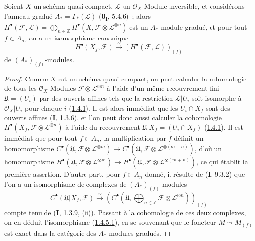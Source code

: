\begin{proposition}[1.4.5]
\label{III.1.4.5-fr}
Soient $X$ un schéma quasi-compact, $\mathcal L$ un $\mathcal O_X$-Module
inversible, et considérons l'anneau gradué
$A_*=\Gamma_*(\mathcal L)$ \textup{(\textbf{0}\textsubscript{I}, 5.4.6)}~; alors
$H^\bullet(\mathcal F,\mathcal L)
=\bigoplus_{n\in\mathbb Z}H^\bullet(X,\mathcal F\otimes\mathcal L^{\otimes n})$
est un $A_*$-module gradué, et pour tout $f\in A_n$, on a un
isomorphisme canonique
\begin{equation}
\label{III.1.4.5.1-fr}
\tag{1.4.5.1}
H^\bullet(X_f,\mathcal F)
\xrightarrow{\sim}(H^\bullet(\mathcal F,\mathcal L))_{(f)}
\end{equation}
de $(A_*)_{(f)}$-modules.
\end{proposition}

\begin{proof}
Comme $X$ est un schéma quasi-compact, on peut calculer la cohomologie de
tous les $\mathcal O_X$-Modules
$\mathcal F\otimes\mathcal L^{\otimes n}$ à l'aide d'un même recouvrement
fini $\mathfrak U=(U_i)$ par des ouverts affines tels que la restriction
$\mathcal L\vert U_i$ soit isomorphe à $\mathcal O_X\vert U_i$ pour chaque
$i$ (\hyperref[III.1.4.1-fr]{1.4.1}). Il est alors immédiat que les
$U_i\cap X_f$ sont des ouverts affines (\textbf{I}, 1.3.6), et l'on peut donc aussi
calculer la cohomologie
$H^\bullet(X_f,\mathcal F\otimes\mathcal L^{\otimes n})$ à l'aide du
recouvrement $\mathfrak U\vert X_f=(U_i\cap X_f)$
(\hyperref[III.1.4.1-fr]{1.4.1}). Il est immédiat que pour tout $f\in A_n$,
la multiplication par $f$ définit un homomorphisme
$C^\bullet(\mathfrak U,\mathcal F\otimes\mathcal L^{\otimes m})
\longrightarrow
C^\bullet(\mathfrak U,\mathcal F\otimes\mathcal L^{\otimes(m+n)})$,
d'où un homomorphisme
$H^\bullet(\mathfrak U,\mathcal F\otimes\mathcal L^{\otimes m})
\longrightarrow
H^\bullet(\mathfrak U,\mathcal F\otimes\mathcal L^{\otimes(m+n)})$,
ce qui établit la première assertion. D'autre part, pour $f\in A_n$ donné,
il résulte de (\textbf{I}, 9.3.2) que l'on a un isomorphisme de complexes de
$(A_*)_{(f)}$-modules
\[
C^\bullet(\mathfrak U\vert X_f,\mathcal F)
\xrightarrow{\sim}
\left(C^\bullet\left(\mathfrak U,
\bigoplus_{n\in\mathbb Z}\mathcal F\otimes\mathcal L^{\otimes n}
\right)\right)_{(f)}
\]
compte tenu de (\textbf{I}, 1.3.9, (ii)). Passant à la cohomologie de ces deux
complexes, on en déduit l'isomorphisme
(\hyperref[III.1.4.5.1-fr]{1.4.5.1}), en se souvenant que le foncteur
$M\leadsto M_{(f)}$ est exact dans la catégorie des $A_*$-modules
gradués.
\end{proof}

